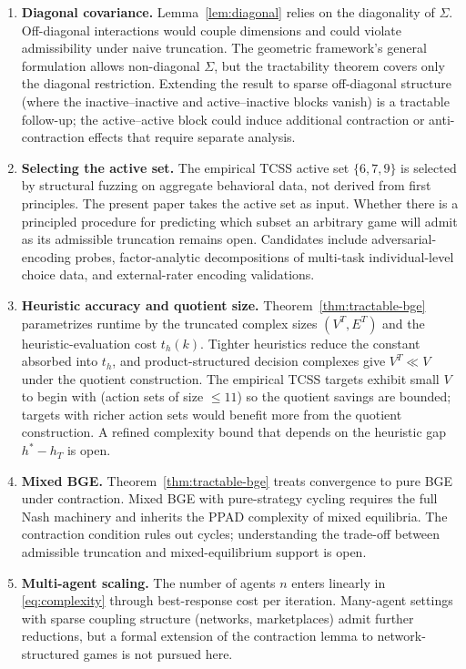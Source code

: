 \documentclass[11pt]{article}
\theoremstyle{definition}
\theoremstyle{remark}
\begin{document}
\begin{enumerate}

\item \textbf{Diagonal covariance.} Lemma~\ref{lem:diagonal} relies on the diagonality of $\Sigma$.
Off-diagonal interactions would couple dimensions and could violate admissibility under naive
truncation. The geometric framework's general formulation allows non-diagonal $\Sigma$, but the
tractability theorem covers only the diagonal restriction. Extending the result to sparse off-diagonal
structure (where the inactive--inactive and active--inactive blocks vanish) is a tractable
follow-up; the active--active block could induce additional contraction or anti-contraction effects
that require separate analysis.

\item \textbf{Selecting the active set.} The empirical TCSS active set $\{6, 7, 9\}$ is selected by
structural fuzzing on aggregate behavioral data, not derived from first principles. The present paper
takes the active set as input. Whether there is a principled procedure for predicting which subset
an arbitrary game will admit as its admissible truncation remains open. Candidates include
adversarial-encoding probes, factor-analytic decompositions of multi-task individual-level choice
data, and external-rater encoding validations.

\item \textbf{Heuristic accuracy and quotient size.} Theorem~\ref{thm:tractable-bge} parametrizes
runtime by the truncated complex sizes $(V^T, E^T)$ and the heuristic-evaluation cost $t_h(k)$. Tighter
heuristics reduce the constant absorbed into $t_h$, and product-structured decision complexes give
$V^T \ll V$ under the quotient construction. The empirical TCSS targets exhibit small $V$ to begin
with (action sets of size $\leq 11$) so the quotient savings are bounded; targets with richer action
sets would benefit more from the quotient construction. A refined complexity bound that depends on
the heuristic gap $h^* - h_T$ is open.

\item \textbf{Mixed BGE.} Theorem~\ref{thm:tractable-bge} treats convergence to pure BGE under
contraction. Mixed BGE with pure-strategy cycling requires the full Nash machinery and inherits the
\textsc{PPAD} complexity of mixed equilibria. The contraction condition rules out cycles; understanding
the trade-off between admissible truncation and mixed-equilibrium support is open.

\item \textbf{Multi-agent scaling.} The number of agents $n$ enters linearly in \eqref{eq:complexity}
through best-response cost per iteration. Many-agent settings with sparse coupling structure
(networks, marketplaces) admit further reductions, but a formal extension of the contraction lemma
to network-structured games is not pursued here.


\end{enumerate}
\end{document}
